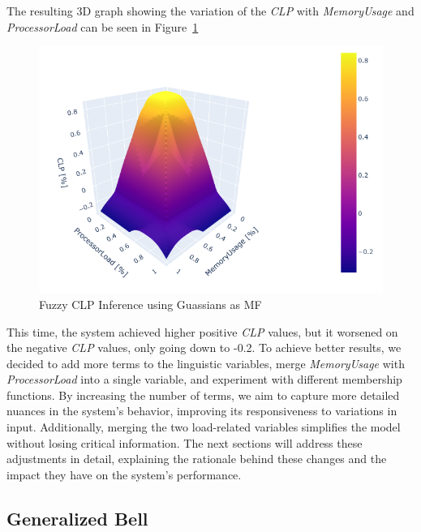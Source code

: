 \documentclass[titlepage]{article}
\begin{document}
\vspace{10mm}

The resulting 3D graph showing the variation of the \textit{CLP} with \textit{MemoryUsage} and \textit{ProcessorLoad} can be seen in Figure~\ref{fig:3d_gaussian}

\begin{figure}[H]
    \centering
\includegraphics[scale = 0.7]{../images/3d_guassian}
\caption{Fuzzy CLP Inference using Guassians as MF}
\label{fig:3d_gaussian}
\end{figure}

\vspace{10mm}


This time, the system achieved higher positive \textit{CLP} values, but it worsened on the negative \textit{CLP} values, only going down to -0.2.
To achieve better results, we decided to add more terms to the linguistic variables, merge \textit{MemoryUsage} with \textit{ProcessorLoad} into a single variable, and experiment with different membership functions. By increasing the number of terms, we aim to capture more detailed nuances in the system's behavior, improving its responsiveness to variations in input. Additionally, merging the two load-related variables simplifies the model without losing critical information. The next sections will address these adjustments in detail, explaining the rationale behind these changes and the impact they have on the system's performance.


\subsection{Generalized Bell}
\end{document}
